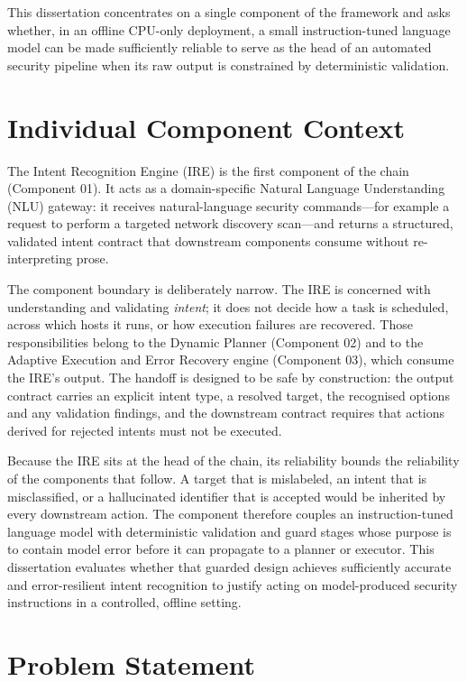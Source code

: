 This dissertation concentrates on a single component of the framework and asks
whether, in an offline CPU-only deployment, a small instruction-tuned language
model can be made sufficiently reliable to serve as the head of an automated
security pipeline when its raw output is constrained by deterministic
validation.

\section{Individual Component Context}\label{sec:individual-component-context}

The Intent Recognition Engine (IRE) is the first component of the chain
(Component 01). It acts as a domain-specific Natural Language Understanding (NLU)
gateway: it receives natural-language security commands---for example a request
to perform a targeted network discovery scan---and returns a structured,
validated intent contract that downstream components consume without
re-interpreting prose.

The component boundary is deliberately narrow. The IRE is concerned with
understanding and validating \emph{intent}; it does not decide how a task is
scheduled, across which hosts it runs, or how execution failures are recovered.
Those responsibilities belong to the Dynamic Planner (Component 02) and to the
Adaptive Execution and Error Recovery engine (Component 03), which consume the
IRE's output. The handoff is designed to be safe by construction: the output
contract carries an explicit intent type, a resolved target, the recognised
options and any validation findings, and the downstream contract requires that
actions derived for rejected intents must not be executed.

Because the IRE sits at the head of the chain, its reliability bounds the
reliability of the components that follow. A target that is mislabeled, an
intent that is misclassified, or a hallucinated identifier that is accepted would
be inherited by every downstream action. The component therefore couples an
instruction-tuned language model with deterministic validation and guard stages
whose purpose is to contain model error before it can propagate to a planner or
executor. This dissertation evaluates whether that guarded design achieves
sufficiently accurate and error-resilient intent recognition to justify acting on
model-produced security instructions in a controlled, offline setting.

\section{Problem Statement}\label{sec:problem-statement}

